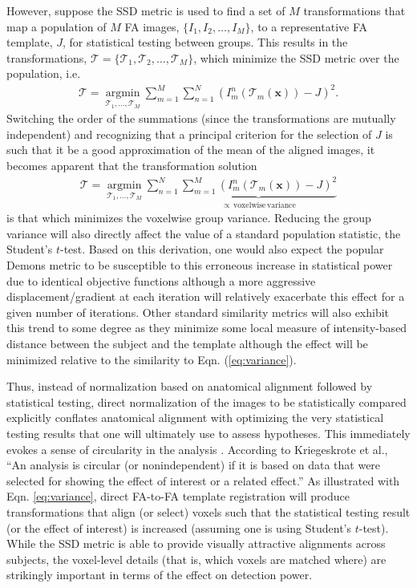 \documentclass[final,5p,times,twocolumn]{elsarticle}
\begin{document}
However, suppose the SSD metric is used to find a set of $M$ transformations that map a population of $M$ FA images, $\{I_1, I_2, \ldots, I_M\}$, to a representative FA template, $J$, for statistical testing between groups. This results in the transformations,
$\boldsymbol{\mathcal{T}} = \{\mathcal{T}_1, \mathcal{T}_2,\ldots,\mathcal{T}_M \}$, which minimize the SSD metric over the population, i.e.
\begin{align}
  \boldsymbol{\mathcal{T}} = \underset{\mathcal{T}_1, \ldots, \mathcal{T}_M}{\operatorname{argmin}}
    \sum_{m=1}^M\sum_{n=1}^N \left( I^n_m( \mathcal{T}_m(\mathbf{x}) ) - J \right)^2.
\end{align}
Switching the order of the summations (since the transformations are mutually independent) and recognizing that a principal criterion for the selection of $J$ is such that it be a good approximation of the mean of the aligned images, it becomes apparent that the transformation solution
\begin{align}\label{eq:variance}
  \boldsymbol{\mathcal{T}} = \underset{\mathcal{T}_1, \ldots, \mathcal{T}_M}{\operatorname{argmin}}
    \sum_{n=1}^N \underbrace{\sum_{m=1}^M \left( I^n_m( \mathcal{T}_m(\mathbf{x}) ) - J \right)^2}_{
    \propto\mathrm{\,voxelwise\,variance}}
\end{align}
is that which minimizes the voxelwise group variance.  Reducing the group variance will also directly affect the value of a standard population statistic, the Student's $t$-test.  Based on this derivation, one would also expect the popular Demons metric to be susceptible to this erroneous increase in statistical power due to identical objective functions although a more aggressive displacement/gradient at each iteration will relatively exacerbate this effect for a given number of iterations.  
Other standard similarity metrics will also exhibit this
trend to some degree as they minimize some local measure of intensity-based distance between the subject and the template although the effect will be minimized relative to the similarity to Eqn. (\ref{eq:variance}).  

Thus, instead of normalization based on anatomical alignment followed by
statistical testing, direct normalization of the images to be statistically compared 
explicitly conflates
anatomical alignment with optimizing the very statistical testing
results that one will ultimately use to assess hypotheses.  This immediately evokes a sense of circularity in the analysis \citep{Kriegeskorte2010}.
According to Kriegeskrote et al., ``An analysis is circular (or nonindependent) if it is based on data that were selected for showing the effect of interest or a related effect.''  As illustrated with
Eqn. \ref{eq:variance}, direct FA-to-FA template registration will produce transformations that align (or select) voxels such that the statistical testing result (or the effect of interest) is increased (assuming one is using Student's 
$t$-test).  While the SSD metric is able to provide visually attractive alignments across subjects, the voxel-level details (that is, which voxels are matched where) are strikingly important in terms of the effect on detection power.  
\end{document}
